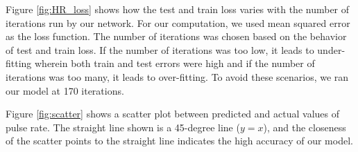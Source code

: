 Figure \ref{fig:HR_loss} shows how the test and train loss varies with the number of iterations run by our network. For our computation, we used mean squared error as the loss function. The number of iterations was chosen based on the behavior of test and train loss. If the number of iterations was too low, it leads to under-fitting wherein both train and test errors were high and if the number of iterations was too many, it leads to over-fitting. To avoid these scenarios, we ran our model at 170 iterations. 
 

 
 

Figure \ref{fig:scatter} shows a scatter plot between predicted and actual values of pulse rate. The straight line shown is a 45-degree line (\(y=x\)), and the closeness of the scatter points to the straight line indicates the high accuracy of our model.   

%








